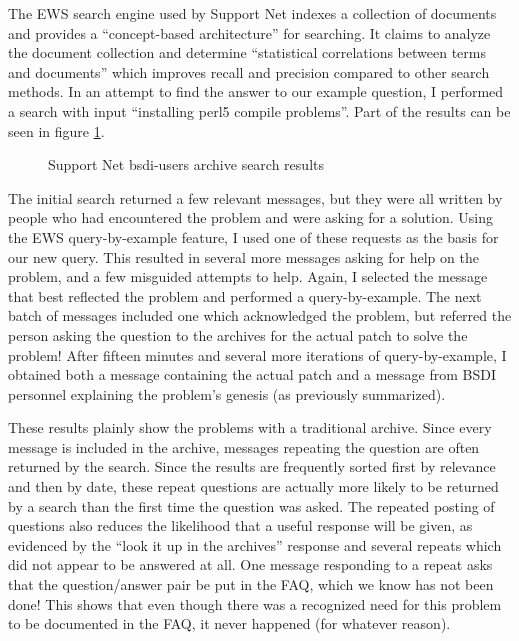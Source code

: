 The EWS search engine used by Support Net indexes a collection of documents and
provides a ``concept-based architecture'' for searching. It claims to analyze
the document collection and determine ``statistical correlations between terms
and documents'' which improves recall and precision compared to other search
methods. In an attempt to find the answer to our example question, I performed
a search with input ``installing perl5 compile problems''. Part of the results
can be seen in figure \ref{fig:supportnet-search}.

\begin{figure}[htbp]
  {\centerline {}}
  \caption{Support Net bsdi-users archive search results}
  \label{fig:supportnet-search}
\end{figure}

The initial search returned a few relevant messages, but they were all written
by people who had encountered the problem and were asking for a solution. Using
the EWS query-by-example feature, I used one of these requests as the basis
for our new query. This resulted in several more messages asking for help on
the problem, and a few misguided attempts to help. Again, I selected the
message that best reflected the problem and performed a query-by-example. The
next batch of messages included one which acknowledged the problem, but
referred the person asking the question to the archives for the actual patch to
solve the problem! After fifteen minutes and several more iterations of
query-by-example, I obtained both a message containing the actual patch and a
message from BSDI personnel explaining the problem's genesis (as previously
summarized).

These results plainly show the problems with a traditional archive. Since every
message is included in the archive, messages repeating the question are often
returned by the search. Since the results are frequently sorted first by
relevance and then by date, these repeat questions are actually more likely to
be returned by a search than the first time the question was asked. The
repeated posting of questions also reduces the likelihood that a useful
response will be given, as evidenced by the ``look it up in the archives''
response and several repeats which did not appear to be answered at all. One
message responding to a repeat asks that the question/answer pair be put in the
FAQ, which we know has not been done! This shows that even though there was a
recognized need for this problem to be documented in the FAQ, it never happened
(for whatever reason).

